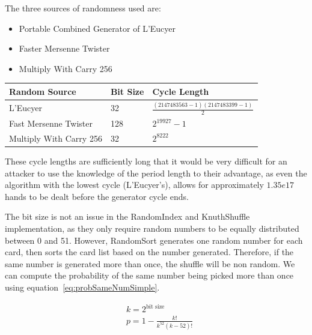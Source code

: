 \vspace{0.3cm}

The three sources of randomness used are:

\begin{itemize}
    \item Portable Combined Generator of L'Eucyer \parencite{leucyer1988}
    \item Faster Mersenne Twister \parencite{matsumoto1998,saito2008}
    \item Multiply With Carry 256 \parencite{marsaglia2003}
\end{itemize}

\begin{center}
    \begin{tabular}{l l l}
    \toprule
    Random Source           & Bit Size  & Cycle Length  \\
    \midrule
    L'Eucyer                & 32        & $ \displaystyle \frac{(2147483563-1)(2147483399-1)}{2}$   \\ \addlinespace
    Fast Mersenne Twister   & 128       & $ \displaystyle {2}^{19927}-1$                            \\ \addlinespace
    Multiply With Carry 256  & 32        & $ \displaystyle {2}^{8222}$                               \\
    \bottomrule
    \end{tabular}
\end{center}

These cycle lengths are sufficiently long that it would be very difficult
for an attacker to use the knowledge of the period length to their advantage,
as even the algorithm with the lowest cycle (L'Eucyer's), allows for
approximately $1.35e17$ hands to be dealt before the generator cycle ends.

The bit size is not an issue in the RandomIndex and KnuthShuffle
implementation, as they only require random numbers to be equally distributed
between 0 and 51. However, RandomSort generates one random number for each
card, then sorts the card list based on the number generated. Therefore, if
the same number is generated more than once, the shuffle will be non random.
We can compute the probability of the same number being picked more than once
using equation~\ref{eq:probSameNumSimple}.

\begin{equation} \label{eq:probSameNumSimple}
\begin{split}
& k = 2^\text{bit size}\\
& p = 1 - \frac{k!}{{k^{52}}(k - 52)!}
\end{split}
\end{equation}

